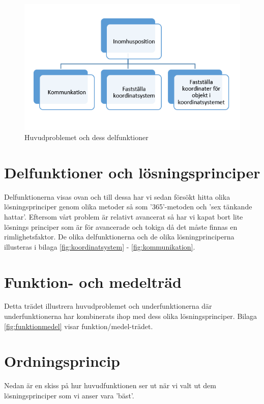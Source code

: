 \documentclass[11pt, a4paper]{report}
\begin{document}
\begin{figure}[H]
	\begin{center}
		\includegraphics [width=12cm,angle=0]{delfunktioner.png}
		\caption{Huvudproblemet och dess delfunktioner}
		\label{fig:huvudproblem}
	\end{center}
\end{figure}


\section{Delfunktioner och lösningsprinciper}

Delfunktionerna visas ovan och till dessa har vi sedan försökt hitta olika lösningsprinciper genom olika metoder så som '365'-metoden och 'sex tänkande hattar'. Eftersom vårt problem är relativt avancerat så har vi kapat bort lite lösnings principer som är för avancerade och tokiga då det måste finnas en rimlighetsfaktor. De olika delfunktionerna och de olika lösningprinciperna illusteras i bilaga \ref{fig:koordinatsystem} - \ref{fig:kommunikation}.

\section{Funktion- och medelträd}

Detta trädet illustrera huvudproblemet och underfunktionerna där underfunktionerna har kombinerats ihop med dess olika lösningsprinciper. Bilaga \ref{fig:funktionmedel} visar funktion/medel-trädet.


\section{Ordningsprincip}

Nedan är en skiss på hur huvudfunktionen ser ut när vi valt ut dem lösningsprinciper som vi anser vara 'bäst'. \\
\end{document}
